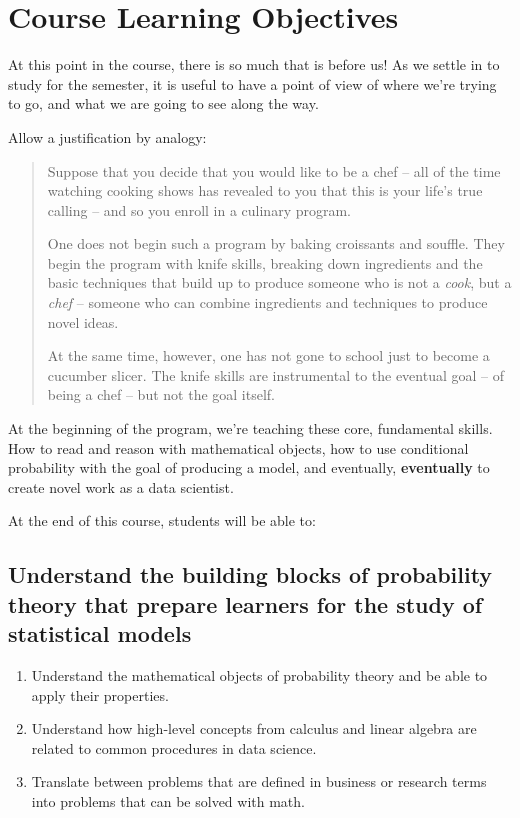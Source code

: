 \documentclass[
]{book}
\providecommand{\tightlist}{%
  \setlength{\itemsep}{0pt}\setlength{\parskip}{0pt}}
\theoremstyle{definition}
\theoremstyle{definition}
\theoremstyle{definition}
\theoremstyle{definition}
\theoremstyle{remark}
\begin{document}
\hypertarget{course-learning-objectives}{%
\section{Course Learning Objectives}\label{course-learning-objectives}}

At this point in the course, there is so much that is before us! As we settle in to study for the semester, it is useful to have a point of view of where we're trying to go, and what we are going to see along the way.

Allow a justification by analogy:

\begin{quote}
Suppose that you decide that you would like to be a chef -- all of the time watching cooking shows has revealed to you that this is your life's true calling -- and so you enroll in a culinary program.

One does not begin such a program by baking croissants and souffle. They begin the program with knife skills, breaking down ingredients and the basic techniques that build up to produce someone who is not a \emph{cook}, but a \emph{chef} -- someone who can combine ingredients and techniques to produce novel ideas.

At the same time, however, one has not gone to school just to become a cucumber slicer. The knife skills are instrumental to the eventual goal -- of being a chef -- but not the goal itself.
\end{quote}

At the beginning of the program, we're teaching these core, fundamental skills. How to read and reason with mathematical objects, how to use conditional probability with the goal of producing a model, and eventually, \textbf{eventually} to create novel work as a data scientist.

At the end of this course, students will be able to:

\hypertarget{understand-the-building-blocks-of-probability-theory-that-prepare-learners-for-the-study-of-statistical-models}{%
\subsection{Understand the building blocks of probability theory that prepare learners for the study of statistical models}\label{understand-the-building-blocks-of-probability-theory-that-prepare-learners-for-the-study-of-statistical-models}}

\begin{enumerate}
\def\labelenumi{\arabic{enumi}.}
\tightlist
\item
  Understand the mathematical objects of probability theory and be able to apply their properties.
\item
  Understand how high-level concepts from calculus and linear algebra are related to common procedures in data science.
\item
  Translate between problems that are defined in business or research terms into problems that can be solved with math.
\end{enumerate}
\end{document}
